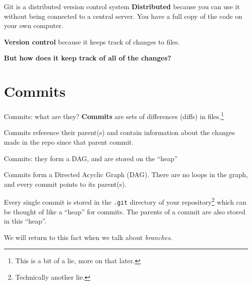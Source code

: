 \documentclass{beeper}
\begin{document}
\begin{frame}{Git is a distributed version control system}
    \textbf{Distributed} because you can use it without being connected to a
    central server. You have a full copy of the code on your own computer.

    \textbf{Version control} because it keeps track of changes to files.

    \pause

    \textbf{But how does it keep track of all of the changes?}
\end{frame}

\section{Commits}

\begin{frame}{Commits: what are they?}
    \textbf{Commits} are sets of differences (diffs) in
    files.\footnote[frame]{This is a bit of a lie, more on that later.}
    \pause

    Commits reference their parent(s) and contain information about the changes
    made in the repo since that parent commit.

    \begin{center}
    \end{center}
\end{frame}

\begin{frame}{Commits: they form a DAG, and are stored on the ``heap''}

    Commits form a Directed Acyclic Graph (DAG). There are no loops in the
    graph, and every commit points to its parent(s).

    Every single commit is stored in the \texttt{.git} directory of your
    repository\footnote[frame]{Technically another lie.} which can be thought of
    like a ``heap'' for commits. The parents of a commit are also stored in this
    ``heap''.

    We will return to this fact when we talk about \textit{branches}.

\end{frame}
\end{document}
